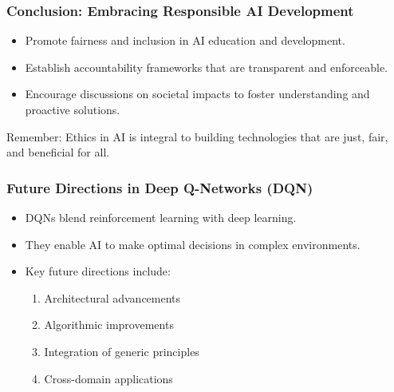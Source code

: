\documentclass[aspectratio=169]{beamer}
\begin{document}
\begin{frame}[fragile]
    \frametitle{Conclusion: Embracing Responsible AI Development}
    \begin{itemize}
        \item Promote fairness and inclusion in AI education and development.
        \item Establish accountability frameworks that are transparent and enforceable.
        \item Encourage discussions on societal impacts to foster understanding and proactive solutions.
    \end{itemize}
    
    \begin{block}{Remember:}
        Ethics in AI is integral to building technologies that are just, fair, and beneficial for all.
    \end{block}
\end{frame}

\begin{frame}[fragile]
    \frametitle{Future Directions in Deep Q-Networks (DQN)}
    \begin{itemize}
        \item DQNs blend reinforcement learning with deep learning.
        \item They enable AI to make optimal decisions in complex environments.
        \item Key future directions include:
        \begin{enumerate}
            \item Architectural advancements
            \item Algorithmic improvements
            \item Integration of generic principles
            \item Cross-domain applications
        \end{enumerate}
    \end{itemize}
\end{frame}
\end{document}
